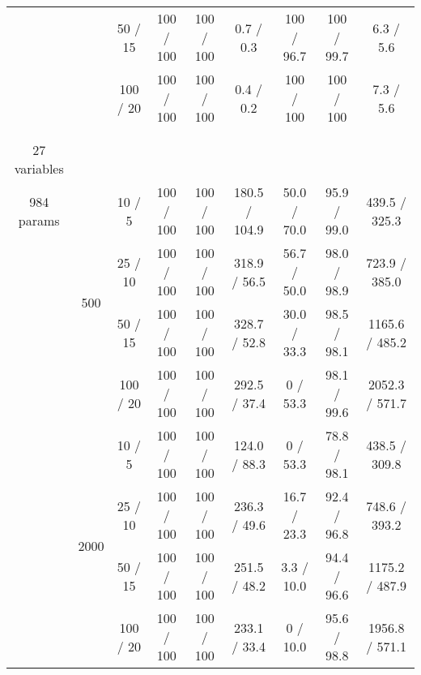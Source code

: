 \documentclass[twoside,11pt]{article}
\begin{document}
\begin{table}[ht]
\begin{tabular}{@{}c | c | c || c | c | c || c | c | c@{}}
& & 50 / 15 & 100 / 100 & 100 / 100 & 0.7 / 0.3 & \cellcolor{yellow!100} 100 / 96.7 & \cellcolor{yellow!100} 100 / 99.7 & 6.3 / 5.6 \\

& & 100 / 20 & 100 / 100 & 100 / 100 & 0.4 / 0.2 & 100 / 100 & 100 / 100 & 7.3 / 5.6 \\

\hhline {=|=|=||=|=|=||=|=|=}

\multirow{8}{*}{\thead{\textbf{insurance} \\ \\ 27 variables \\ 984 params}} & \multirow{4}{*}{500}
& 10 / 5  & 100 / 100 & 100 / 100 & 180.5 / 104.9 & \cellcolor{yellow!100} 50.0 / 70.0 & \cellcolor{yellow!100} 95.9 / 99.0 & 439.5 / 325.3  \\
& & 25 / 10 & 100 / 100 & 100 / 100 & 318.9 / 56.5 &\cellcolor{yellow!100}  56.7 / 50.0 & \cellcolor{yellow!100} 98.0 / 98.9 & 723.9 / 385.0  \\
& & 50 / 15 & 100 / 100 & 100 / 100 & 328.7 / 52.8 & \cellcolor{yellow!100} 30.0 / 33.3 & \cellcolor{yellow!100} 98.5 / 98.1 & 1165.6 / 485.2  \\
& & 100 / 20 & 100 / 100 & 100 / 100 & 292.5 / 37.4 & \cellcolor{yellow!100} 0 / 53.3 & \cellcolor{yellow!100} 98.1 / 99.6 & 2052.3 / 571.7 \\

\hhline {~|-|-||-|-|-||-|-|-}

& \multirow{4}{*}{2000}
& 10 / 5 & 100 / 100 & 100 / 100 & 124.0 / 88.3 &  \cellcolor{yellow!100} 0 / 53.3 &  \cellcolor{yellow!100} 78.8 / 98.1 & 438.5 / 309.8  \\
& & 25 / 10 & 100 / 100  & 100 / 100 & 236.3 / 49.6 & \cellcolor{yellow!100}  16.7 / 23.3 &  \cellcolor{yellow!100} 92.4 / 96.8 & 748.6 / 393.2 \\
& & 50 / 15 & 100 / 100 & 100 / 100  & 251.5 / 48.2 &  \cellcolor{yellow!100} 3.3 / 10.0 &  \cellcolor{yellow!100} 94.4 / 96.6 & 1175.2 / 487.9  \\
& & 100 / 20 & 100 / 100 & 100 / 100 & 233.1 / 33.4 & \cellcolor{yellow!100}  0 / 10.0  &  \cellcolor{yellow!100} 95.6 / 98.8 & 1956.8 / 571.1 \\


\end{tabular}
\end{table}
\end{document}
